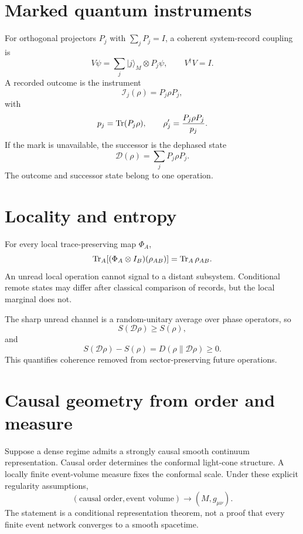 \documentclass[11pt,a4paper]{article}
\begin{document}
\section{Marked quantum instruments}
For orthogonal projectors $P_j$ with $\sum_jP_j=I$, a coherent system-record coupling is
\begin{equation}
V\psi=\sum_j|j\rangle_M\otimes P_j\psi,\qquad V^\dagger V=I.
\end{equation}
A recorded outcome is the instrument
\begin{equation}
\mathcal I_j(\rho)=P_j\rho P_j,
\end{equation}
with
\begin{equation}
p_j=\operatorname{Tr}(P_j\rho),\qquad \rho'_j=\frac{P_j\rho P_j}{p_j}.
\end{equation}
If the mark is unavailable, the successor is the dephased state
\begin{equation}
\mathcal D(\rho)=\sum_jP_j\rho P_j.
\end{equation}
The outcome and successor state belong to one operation.

\section{Locality and entropy}
For every local trace-preserving map $\Phi_A$,
\begin{equation}
\operatorname{Tr}_A[(\Phi_A\otimes I_B)(\rho_{AB})]=\operatorname{Tr}_A\rho_{AB}.
\end{equation}
An unread local operation cannot signal to a distant subsystem. Conditional remote states may differ after classical comparison of records, but the local marginal does not.

The sharp unread channel is a random-unitary average over phase operators, so
\begin{equation}
S(\mathcal D\rho)\ge S(\rho),
\end{equation}
and
\begin{equation}
S(\mathcal D\rho)-S(\rho)=D(\rho\|\mathcal D\rho)\ge0.
\end{equation}
This quantifies coherence removed from sector-preserving future operations.

\section{Causal geometry from order and measure}
Suppose a dense regime admits a strongly causal smooth continuum representation. Causal order determines the conformal light-cone structure. A locally finite event-volume measure fixes the conformal scale. Under these explicit regularity assumptions,
\begin{equation}
(\text{causal order},\text{event volume})\longrightarrow(M,g_{\mu\nu}).
\end{equation}
The statement is a conditional representation theorem, not a proof that every finite event network converges to a smooth spacetime.
\end{document}
